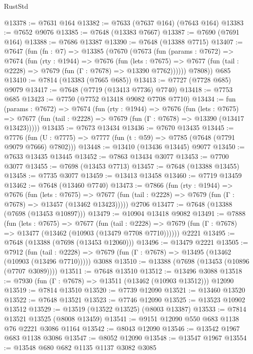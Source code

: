 \begin{lexlean}{RustStd}
\begin{coremodule}
@13378 := @7631 @164
@13382 := @7633 (@7637 @164) (@7643 @164)
@13383 := @7652 @9076
@13385 := @7648 (@13383 @7667)
@13387 := @7690 (@7691 @164)
@13388 := @7686 @13387
@13390 := @7648 (@13388 @7715)
@13407 := @7647
    (fun (fn : @7) =>
    @13385
      (@7670
        (@7673
          (fun (params : @7672) =>
          @7674
            (fun (rty : @1944) =>
            @7676
              (fun (lets : @7675) =>
              @7677 (fun (tail : @2228) => @7679 (fun (Γ : @7678) => @13390 @7762))))))
        @7808))
    @685
@13410 := @7814 (@13383 (@7665 @685))
@13413 := @7727 (@7728 @685) @9079
@13417 := @7648 (@7719 (@13413 @7736) @7740)
@13418 := @7753 @685
@13423 := @7750 (@7752 @13418 @9082 @7708 @7710)
@13434 := fun (params : @7672) =>
  @7674
    (fun (rty : @1944) =>
    @7676
      (fun (lets : @7675) =>
      @7677 (fun (tail : @2228) => @7679 (fun (Γ : @7678) => @13390 (@13417 @13423)))))
@13435 := @7673 @13434
@13436 := @7670 @13435
@13445 := @7776
    (fun (U : @7775) => @7777 (fun (t : @59) => @7785 (@7648 (@7791 @9079 @7666) @7802)))
@13448 := @13410 (@13436 @13445) @9077
@13450 := @7633 @13435 @13445
@13452 := @7863 @13434 @3077
@13453 := @7700 @3077
@13455 := @7698 (@13453 @7713)
@13457 := @7648 (@13388 @13455)
@13458 := @7735 @3077
@13459 := @13413 @13458
@13460 := @7719 @13459
@13462 := @7648 (@13460 @7740)
@13473 := @7866
    (fun (rty : @1944) =>
    @7676
      (fun (lets : @7675) =>
      @7677 (fun (tail : @2228) => @7679 (fun (Γ : @7678) => @13457 (@13462 @13423)))))
    @2706
@13477 := @7648 (@13388 (@7698 (@13453 @10897)))
@13479 := @10904 @13418 @9082
@13491 := @7888
    (fun (lets : @7675) =>
    @7677
      (fun (tail : @2228) =>
      @7679 (fun (Γ : @7678) => @13477 (@13462 (@10903 (@13479 @7708 @7710))))))
    @2221
@13495 := @7648 (@13388 (@7698 (@13453 @12060)))
@13496 := @13479 @2221
@13505 := @7912
    (fun (tail : @2228) => @7679 (fun (Γ : @7678) => @13495 (@13462 (@10903 (@13496 @7710)))))
    @3088
@13510 := @13388 (@7698 (@13453 (@10896 (@7707 @3089))))
@13511 := @7648 @13510
@13512 := @13496 @3088
@13518 := @7930 (fun (Γ : @7678) => @13511 (@13462 (@10903 @13512))) @12090
@13519 := @7814 @13510
@13520 := @7739 @12090
@13521 := @13460 @13520
@13522 := @7648 @13521
@13523 := @7746 @12090
@13525 := @13523 @10902 @13512
@13529 := @13519 (@13522 @13525) (@8003 @13387)
@13533 := @7814 @13521 @13525 (@8008 @13459)
@13541 := @9151 @12090 @550 @683 @1138 @76 @2221 @3086 @1164
@13542 := @8043 @12090
@13546 := @13542 @1967 @683 @1138 @3086
@13547 := @8052 @12090
@13548 := @13547 @1967
@13554 := @13548 @680 @682 @1135 @1137 @3082 @3085

\end{coremodule}
\end{lexlean}
